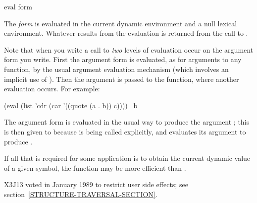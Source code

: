 \begin{defun}[Function]
eval form

The \emph{form} is evaluated in the current dynamic environment and
a null lexical environment.  Whatever results from the evaluation
is returned from the call to .

Note that when you write a call to  \emph{two} levels
of evaluation occur on the argument form you write.
First the argument form is evaluated, as for arguments to any function,
by the usual argument evaluation mechanism
(which involves an implicit use of ).  Then the argument
is passed to the  function, where another evaluation occurs.
For example:
\begin{lisp}
(eval (list 'cdr (car '((quote (a . b)) c)))) \EV\ b
\end{lisp}
The argument form  is evaluated
in the usual way to produce the argument ;
this is then given to  because  is being called explicitly,
and  evaluates its argument  to produce .

If all that is required for some application is
to obtain the current dynamic value of a given symbol, the function
 may be more efficient than .

\begin{new}
X3J13 voted in January 1989
to restrict user side effects; see section~\ref{STRUCTURE-TRAVERSAL-SECTION}.
\end{new}
\end{defun}

